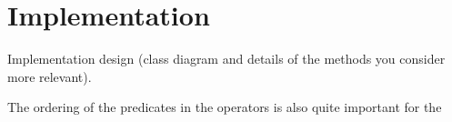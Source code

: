 \section{Implementation}

 Implementation design (class diagram and details of the methods you consider more
relevant).

The ordering of the predicates in the operators is also quite important for the 
